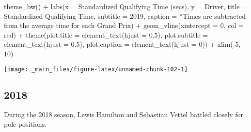 \documentclass[
]{book}
\newenvironment{Shaded}{\begin{snugshade}}{\end{snugshade}}
\newcommand{\AttributeTok}[1]{\textcolor[rgb]{0.77,0.63,0.00}{#1}}
\newcommand{\DecValTok}[1]{\textcolor[rgb]{0.00,0.00,0.81}{#1}}
\newcommand{\FloatTok}[1]{\textcolor[rgb]{0.00,0.00,0.81}{#1}}
\newcommand{\FunctionTok}[1]{\textcolor[rgb]{0.00,0.00,0.00}{#1}}
\newcommand{\NormalTok}[1]{#1}
\newcommand{\SpecialCharTok}[1]{\textcolor[rgb]{0.00,0.00,0.00}{#1}}
\newcommand{\StringTok}[1]{\textcolor[rgb]{0.31,0.60,0.02}{#1}}
\begin{document}
\begin{Shaded}
\begin{Highlighting}[]
  \FunctionTok{theme\_bw}\NormalTok{() }\SpecialCharTok{+}
  \FunctionTok{labs}\NormalTok{(}\AttributeTok{x =} \StringTok{\textquotesingle{}Standardized Qualifying Time (secs)\textquotesingle{}}\NormalTok{,}
       \AttributeTok{y =} \StringTok{\textquotesingle{}Driver\textquotesingle{}}\NormalTok{,}
       \AttributeTok{title =} \StringTok{\textquotesingle{}Standardized Qualifying Time\textquotesingle{}}\NormalTok{,}
       \AttributeTok{subtitle =} \StringTok{\textquotesingle{}2019\textquotesingle{}}\NormalTok{,}
       \AttributeTok{caption =} \StringTok{\textquotesingle{}*Times are subtracted from the average time for each Grand Prix\textquotesingle{}}\NormalTok{) }\SpecialCharTok{+}
  \FunctionTok{geom\_vline}\NormalTok{(}\AttributeTok{xintercept =} \DecValTok{0}\NormalTok{, }\AttributeTok{col =} \StringTok{\textquotesingle{}red\textquotesingle{}}\NormalTok{) }\SpecialCharTok{+}
  \FunctionTok{theme}\NormalTok{(}\AttributeTok{plot.title =} \FunctionTok{element\_text}\NormalTok{(}\AttributeTok{hjust =} \FloatTok{0.5}\NormalTok{),}
        \AttributeTok{plot.subtitle =} \FunctionTok{element\_text}\NormalTok{(}\AttributeTok{hjust =} \FloatTok{0.5}\NormalTok{),}
        \AttributeTok{plot.caption =} \FunctionTok{element\_text}\NormalTok{(}\AttributeTok{hjust =} \DecValTok{0}\NormalTok{)) }\SpecialCharTok{+}
  \FunctionTok{xlim}\NormalTok{(}\SpecialCharTok{{-}}\DecValTok{5}\NormalTok{, }\DecValTok{10}\NormalTok{)}
\end{Highlighting}
\end{Shaded}

\begin{center}\texttt{[image: \_main\_files/figure-latex/unnamed-chunk-102-1]} \end{center}

\hypertarget{section-5}{%
\subsection{2018}\label{section-5}}

During the 2018 season, Lewis Hamilton and Sebastian Vettel battled closely for pole positions.
\end{document}
